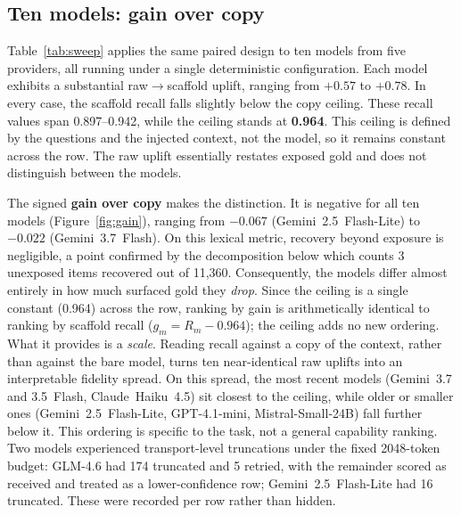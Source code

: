 \documentclass[10pt,twocolumn]{article}
\begin{document}
\subsection{Ten models: gain over copy}\label{sec:tenmodel}
Table~\ref{tab:sweep} applies the same paired design to ten models from five providers, all running under a single deterministic configuration. Each model exhibits a substantial raw$\to$scaffold uplift, ranging from $+0.57$ to $+0.78$. In every case, the scaffold recall falls slightly below the copy ceiling. These recall values span 0.897--0.942, while the ceiling stands at \textbf{0.964}. This ceiling is defined by the questions and the injected context, not the model, so it remains constant across the row. The raw uplift essentially restates exposed gold and does not distinguish between the models.

The signed \textbf{gain over copy} makes the distinction. It is negative for all ten models (Figure~\ref{fig:gain}), ranging from $-0.067$ (Gemini~2.5~Flash-Lite) to $-0.022$ (Gemini~3.7~Flash). On this lexical metric, recovery beyond exposure is negligible, a point confirmed by the decomposition below which counts 3 unexposed items recovered out of 11{,}360. Consequently, the models differ almost entirely in how much surfaced gold they \emph{drop}. Since the ceiling is a single constant (0.964) across the row, ranking by gain is arithmetically identical to ranking by scaffold recall ($g_m=R_m-0.964$); the ceiling adds no new ordering. What it provides is a \emph{scale}. Reading recall against a copy of the context, rather than against the bare model, turns ten near-identical raw uplifts into an interpretable fidelity spread. On this spread, the most recent models (Gemini~3.7 and 3.5~Flash, Claude~Haiku~4.5) sit closest to the ceiling, while older or smaller ones (Gemini~2.5~Flash-Lite, GPT-4.1-mini, Mistral-Small-24B) fall further below it. This ordering is specific to the task, not a general capability ranking. Two models experienced transport-level truncations under the fixed 2048-token budget: GLM-4.6 had 174 truncated and 5 retried, with the remainder scored as received and treated as a lower-confidence row; Gemini~2.5~Flash-Lite had 16 truncated. These were recorded per row rather than hidden.
\end{document}
